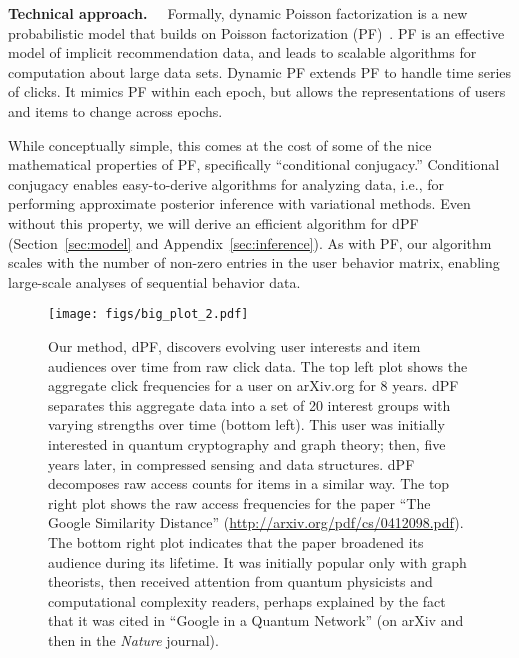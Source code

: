\documentclass{sig-alternate}
\newcommand{\mypar}[1]{\vspace{0.1in}\noindent \textbf{#1 \,}}
\begin{document}
\mypar{Technical approach. \,} Formally, dynamic Poisson factorization
is a new probabilistic model that builds on Poisson factorization
(PF)~\citep{Gopalan:2013b}.  PF is an effective model of implicit
recommendation data, and leads to scalable algorithms for computation
about large data sets.  Dynamic PF extends PF to handle time series of
clicks.  It mimics PF within each epoch, but allows the
representations of users and items to change across epochs.

While conceptually simple, this comes at the cost of some of the nice
mathematical properties of PF, specifically ``conditional conjugacy.''
Conditional conjugacy enables easy-to-derive algorithms for analyzing
data, i.e., for performing approximate posterior inference with
variational methods. Even without this property, we will derive an
efficient algorithm for dPF (Section~\ref{sec:model} and
Appendix~\ref{sec:inference}).  As with PF, our algorithm scales with
the number of non-zero entries in the user behavior matrix, enabling
large-scale analyses of sequential behavior data.





 
\begin{figure*}[ht]
  \begin{center}
  \texttt{[image: figs/big\_plot\_2.pdf]}\vspace{-210pt}
          \end{center}
  \caption{Our method, dPF, discovers evolving user interests and item audiences over time from raw click data. 
The top left plot shows the aggregate click frequencies for a user on arXiv.org for 8 years. 
dPF separates this aggregate data into a set of 20 interest groups with varying strengths over time (bottom left). 
This user was initially interested in quantum cryptography and graph theory; then, five years later, in compressed sensing and data structures. dPF decomposes raw access counts for items in a similar way. The top right plot shows the raw access frequencies for the paper ``The Google Similarity Distance'' ({\small\url{http://arxiv.org/pdf/cs/0412098.pdf}}). The bottom right plot indicates that the paper broadened its audience during its lifetime. It was initially popular only with graph theorists, then received attention from quantum physicists and computational complexity readers, perhaps explained by the fact that it was cited in ``Google in a Quantum Network'' (on arXiv and then in the \emph{Nature} journal).}
  \label{fig:user755}
\end{figure*}
\end{document}
